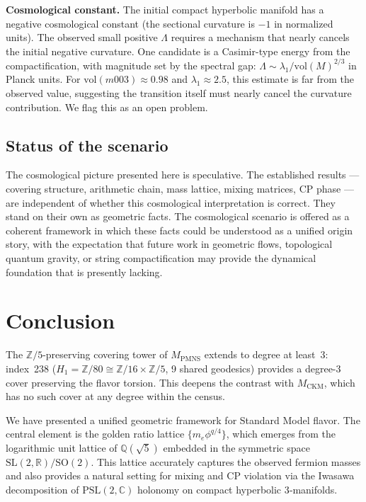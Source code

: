 \documentclass[12pt]{article}
\theoremstyle{definition}
\begin{document}
\textbf{Cosmological constant.} The initial compact hyperbolic
manifold has a negative cosmological constant (the sectional curvature
is $-1$ in normalized units). The observed small positive $\Lambda$
requires a mechanism that nearly cancels the initial negative
curvature. One candidate is a Casimir-type energy from the
compactification, with magnitude set by the spectral gap:
$\Lambda \sim \lambda_1 / \mathrm{vol}(M)^{2/3}$ in Planck units.
For $\mathrm{vol}(m003) \approx 0.98$ and $\lambda_1 \approx 2.5$,
this estimate is far from the observed value, suggesting the
transition itself must nearly cancel the curvature contribution.
We flag this as an open problem.

\subsection{Status of the scenario}

The cosmological picture presented here is speculative. The
established results --- covering structure, arithmetic chain, mass
lattice, mixing matrices, CP phase --- are independent of whether
this cosmological interpretation is correct. They stand on their own
as geometric facts. The cosmological scenario is offered as a
coherent framework in which these facts could be understood as a
unified origin story, with the expectation that future work in
geometric flows, topological quantum gravity, or string
compactification may provide the dynamical foundation that is
presently lacking.

\section{Conclusion}

The $\mathbb{Z}/5$-preserving covering tower of $M_\text{PMNS}$ extends to degree at least~3: index~238 ($H_1=\mathbb{Z}/80\cong\mathbb{Z}/16\times\mathbb{Z}/5$, 9 shared geodesics) provides a degree-3 cover preserving the flavor torsion. This deepens the contrast with $M_\text{CKM}$, which has no such cover at any degree within the census. 
\label{sec:conclusion}

We have presented a unified geometric framework for Standard Model flavor. The central element is the golden ratio lattice $\{m_e \phi^{q/4}\}$, which emerges from the logarithmic unit lattice of $\mathbb{Q}(\sqrt5)$ embedded in the symmetric space $\mathrm{SL}(2,\mathbb{R})/\mathrm{SO}(2)$. This lattice accurately captures the observed fermion masses and also provides a natural setting for mixing and CP violation via the Iwasawa decomposition of $\mathrm{PSL}(2,\mathbb{C})$ holonomy on compact hyperbolic 3‑manifolds.
\end{document}
